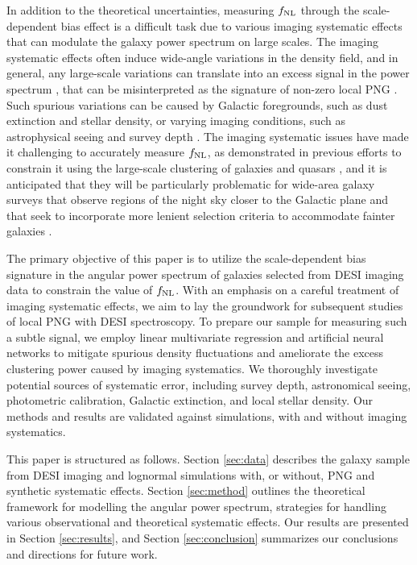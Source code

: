 In addition to the theoretical uncertainties, measuring $f_{\rm NL}$ through the scale-dependent bias effect is a difficult task due to various imaging systematic effects that can modulate the galaxy power spectrum on large scales. The imaging systematic effects often induce wide-angle variations in the density field, and in general, any large-scale variations can translate into an excess signal in the power spectrum \citep[see, e.g.,][]{huterer2013calibration}, that can be misinterpreted as the signature of non-zero local PNG \citep[see, e.g.,][]{PhysRevLett.106.241301}. Such spurious variations can be caused by Galactic foregrounds, such as dust extinction and stellar density, or varying imaging conditions, such as astrophysical seeing and survey depth \citep[see, e.g.,][]{ross2011}. The imaging systematic issues have made it challenging to accurately measure $f_{\rm NL}$, as demonstrated in previous efforts to constrain it using the large-scale clustering of galaxies and quasars \citep[see, e.g.,][]{2013MNRAS.428.1116R,pullen2013systematic, Ho2015JCAP...05..040H}, and it is anticipated that they will be particularly problematic for wide-area galaxy surveys that observe regions of the night sky closer to the Galactic plane and that seek to incorporate more lenient selection criteria to accommodate fainter galaxies \citep[see, e.g,][]{kitanidis2020imaging}.

The primary objective of this paper is to utilize the scale-dependent bias signature in the angular power spectrum of galaxies selected from DESI imaging data to constrain the value of $f_{\rm NL}$. With an emphasis on a careful treatment of imaging systematic effects, we aim to lay the groundwork for subsequent studies of local PNG with DESI spectroscopy. To prepare our sample for measuring such a subtle signal, we employ linear multivariate regression and artificial neural networks to mitigate spurious density fluctuations and ameliorate the excess clustering power caused by imaging systematics. We thoroughly investigate potential sources of systematic error, including survey depth, astronomical seeing, photometric calibration, Galactic extinction, and local stellar density. Our methods and results are validated against simulations, with and without imaging systematics.

This paper is structured as follows. Section \ref{sec:data} describes the galaxy sample from DESI imaging and lognormal simulations with, or without, PNG and synthetic systematic effects. Section \ref{sec:method} outlines the theoretical framework for modelling the angular power spectrum,  strategies for handling various observational and theoretical systematic effects. Our results are presented in Section \ref{sec:results}, and Section \ref{sec:conclusion} summarizes our conclusions and directions for future work.
